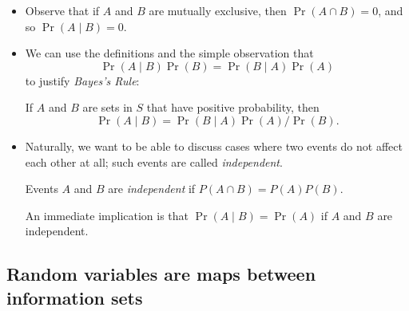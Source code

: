 \begin{itemize}
\item Observe that if $A$ and $B$ are mutually exclusive, then $\Pr(A
  \cap B) = 0$, and so $\Pr(A \mid B) = 0$.

\item We can use the definitions and the simple observation that
  \begin{equation*}
    \Pr(A \mid B) \Pr(B) = \Pr(B \mid A) \Pr(A)
  \end{equation*}
  to justify \emph{Bayes's Rule}:
  \begin{thm}
    If $A$ and $B$ are sets in $S$ that have positive probability, then
    \begin{equation*}
      \Pr(A \mid B) = \Pr(B \mid A) \Pr(A) / \Pr(B).
    \end{equation*}
  \end{thm}

\item Naturally, we want to be able to discuss cases where two events
  do not affect each other at all; such events are called
  \emph{independent}.

  \begin{defn}
    Events $A$ and $B$ are \emph{independent} if $P(A \cap B) = P(A)
    P(B)$.
  \end{defn}

  An immediate implication is that $\Pr(A \mid B) = \Pr(A)$ if $A$ and
  $B$ are independent.

\end{itemize}

\subsection{Random variables are maps between information sets}

